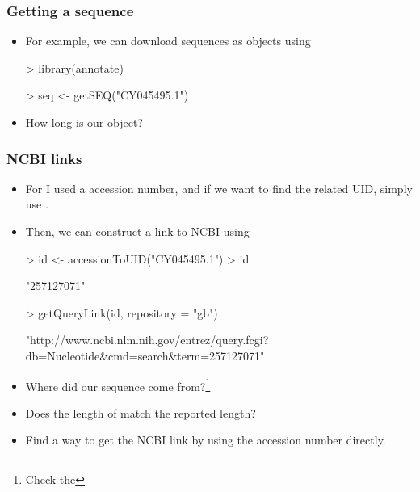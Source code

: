 \begin{frame}
  \frametitle{Getting a sequence}
  \begin{itemize}
  \item For example, we can download sequences as  objects using 
\begin{Schunk}
\begin{Sinput}
> library(annotate)
\end{Sinput}
\end{Schunk}
\begin{Schunk}
\begin{Sinput}
> seq <- getSEQ("CY045495.1")
\end{Sinput}
\end{Schunk}
  \item How long is our  object?
  \end{itemize}
\end{frame}

\begin{frame}
  \frametitle{NCBI links}
  \begin{itemize}
  \item For  I used a accession number, and if we want to find the related UID, simply use .
  \item Then, we can construct a link to NCBI using 
\begin{Schunk}
\begin{Sinput}
> id <- accessionToUID("CY045495.1")
> id
\end{Sinput}
\begin{Soutput}
[1] "257127071"
\end{Soutput}
\begin{Sinput}
> getQueryLink(id, repository = "gb")
\end{Sinput}
\begin{Soutput}
[1] "http://www.ncbi.nlm.nih.gov/entrez/query.fcgi?db=Nucleotide&cmd=search&term=257127071"
\end{Soutput}
\end{Schunk}
  \item Where did our sequence come from?\footnote{Check the }
  \item Does the length of  match the reported length?
  \item Find a way to get the NCBI link by using the accession number directly.
  \end{itemize}
\end{frame}

